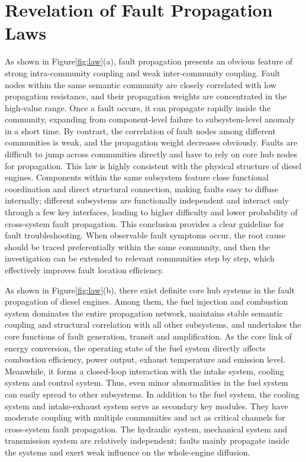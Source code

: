 \documentclass[conference]{IEEEconf}
\begin{document}
\section{Revelation of Fault Propagation Laws}
As shown in Figure\ref{fig:law}(a), fault propagation presents an obvious feature of strong intra-community coupling and weak inter-community coupling. Fault nodes within the same semantic community are closely correlated with low propagation resistance, and their propagation weights are concentrated in the high-value range. Once a fault occurs, it can propagate rapidly inside the community, expanding from component-level failure to subsystem-level anomaly in a short time. By contrast, the correlation of fault nodes among different communities is weak, and the propagation weight decreases obviously. Faults are difficult to jump across communities directly and have to rely on core hub nodes for propagation. This law is highly consistent with the physical structure of diesel engines. Components within the same subsystem feature close functional coordination and direct structural connection, making faults easy to diffuse internally; different subsystems are functionally independent and interact only through a few key interfaces, leading to higher difficulty and lower probability of cross-system fault propagation. This conclusion provides a clear guideline for fault troubleshooting. When observable fault symptoms occur, the root cause should be traced preferentially within the same community, and then the investigation can be extended to relevant communities step by step, which effectively improves fault location efficiency.

As shown in Figure\ref{fig:law}(b), there exist definite core hub systems in the fault propagation of diesel engines. Among them, the fuel injection and combustion system dominates the entire propagation network, maintains stable semantic coupling and structural correlation with all other subsystems, and undertakes the core functions of fault generation, transit and amplification. As the core link of energy conversion, the operating state of the fuel system directly affects combustion efficiency, power output, exhaust temperature and emission level. Meanwhile, it forms a closed-loop interaction with the intake system, cooling system and control system. Thus, even minor abnormalities in the fuel system can easily spread to other subsystems. In addition to the fuel system, the cooling system and intake-exhaust system serve as secondary key modules. They have moderate coupling with multiple communities and act as critical channels for cross-system fault propagation. The hydraulic system, mechanical system and transmission system are relatively independent; faults mainly propagate inside the systems and exert weak influence on the whole-engine diffusion.
\end{document}
